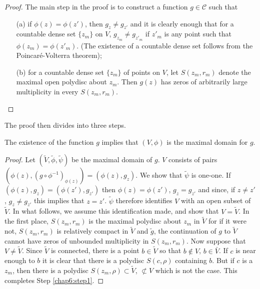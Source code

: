 \begin{proof}
The main step in the proof is to construct a function $g \in
\mathscr{C}$ such that
\begin{itemize}
\item[(a)] if $\phi(z) = \phi(z')$, then $g_z \neq g_{z'}$ and it is
  clearly enough that for a countable dense set $\{z_m\}$ on $V$,
  $g_{z_m} \neq g_{z'_m}$ if $z'_m$ is any point such that $\phi(z_m) =
  \phi(z'_m)$. (The existence of a countable dense set follows from
  the Poincar\'e-Volterra theorem);

\item[(b)] for a countable dense set $\{z_m\}$ of points on $V$, let
  $S (z_m, r_m)$ denote the maximal open polydisc about $z_m$. Then
  $g(z)$ has zeros of arbitrarily large multiplicity in every $S(z_m ,
  r_m)$. 
\end{itemize}
\end{proof}

The proof then divides into three steps. 

\begin{step}\label{chap6:step1}
 The existence of the function $g$ implies
that $(V, \phi)$ is the maximal domain for $g$. 
\end{step}

\begin{proof}
Let $(\tilde{V}, \tilde{\phi}, \tilde{\psi})$ be the maximal domain of
$g$. $V$ consists of pairs $(\phi(z), (g \circ \phi^{-1})_{\phi(z)}) =
(\phi(z), g_z)$. We show that $\tilde{\psi}$ is one-one. If
$(\phi(z), g_z) = (\phi(z'), g_{z'})$ then $\phi(z) = \phi(z')$, $g_z
= g_{z'}$ and since, if $z \neq z'$, $g_z \neq g_{z'}$ this implies
that $z = z'$. $\tilde{\psi}$ therefore identifies $V$ with an open
subset of $\tilde{V}$. In what follows, we assume this identification
made, and show that $V = \tilde{V}$. In the first place, $S (z_m,
r_m)$ is the maximal polydisc about $z_m$ in $\tilde{V}$ for if it
were not, $S(z_m, r_m)$ is relatively compact in $\tilde{V}$ and
$\tilde{g}$, the continuation of $g$ to $\tilde{V}$ cannot have zeros
of unbounded multiplicity in $S(z_m, r_m)$. Now suppose
that\pageoriginale $V \neq \tilde{V}$. Since $\tilde{V}$  is
connected, there is a point $b \in \tilde{V} $ so that $b \notin V$,
$b \in\bar{V}$. If $c$ is near enough to $b$ it is clear that there is
a polydisc $S(c, \rho)$ containing $b$. But if $c$ is a $z_m$, then
there is a polydisc $S (z_m, \rho) \subset \tilde{V}$, $\not\subset V$
which is not the case. This completes Step \ref{chap6:step1}. 
\end{proof}

